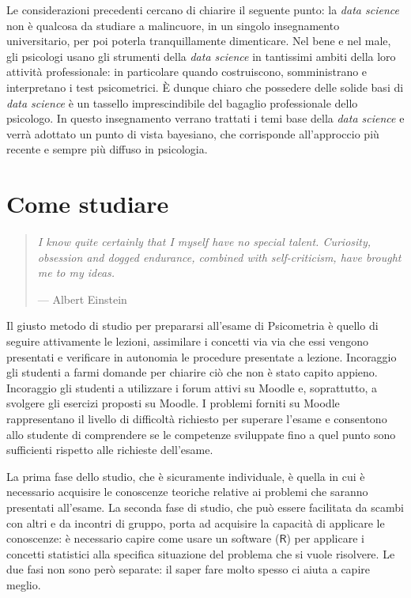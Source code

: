 \documentclass[
  10pt,
  italian,
  a4paper,
  extrafontsizes,onecolumn,openright
  ]{memoir}
\theoremstyle{definition}
\theoremstyle{definition}
\theoremstyle{definition}
\theoremstyle{definition}
\theoremstyle{remark}
\begin{document}
Le considerazioni precedenti cercano di chiarire il seguente punto: la \emph{data science} non è qualcosa da studiare a malincuore, in un singolo insegnamento universitario, per poi poterla tranquillamente dimenticare. Nel bene e nel male, gli psicologi usano gli strumenti della \emph{data science} in tantissimi ambiti della loro attività professionale: in particolare quando costruiscono, somministrano e interpretano i test psicometrici. È dunque chiaro che possedere delle solide basi di \emph{data science} è un tassello imprescindibile del bagaglio professionale dello psicologo. In questo insegnamento verrano trattati i temi base della \emph{data science} e verrà adottato un punto di vista bayesiano, che corrisponde all'approccio più recente e sempre più diffuso in psicologia.

\hypertarget{come-studiare}{%
\section*{Come studiare}\label{come-studiare}}

\begin{quote}
\emph{I know quite certainly that I myself have no special talent. Curiosity, obsession and dogged endurance, combined with self-criticism, have brought me to my ideas.}

\hfill --- Albert Einstein
\end{quote}

Il giusto metodo di studio per prepararsi all'esame di Psicometria è quello di seguire attivamente le lezioni, assimilare i concetti via via che essi vengono presentati e verificare in autonomia le procedure presentate a lezione. Incoraggio gli studenti a farmi domande per chiarire ciò che non è stato capito appieno. Incoraggio gli studenti a utilizzare i forum attivi su Moodle e, soprattutto, a svolgere gli esercizi proposti su Moodle. I problemi forniti su Moodle rappresentano il livello di difficoltà richiesto per superare l'esame e consentono allo studente di comprendere se le competenze sviluppate fino a quel punto sono sufficienti rispetto alle richieste dell'esame.

La prima fase dello studio, che è sicuramente individuale, è quella in cui è necessario acquisire le conoscenze teoriche relative ai problemi che saranno presentati all'esame. La seconda fase di studio, che può essere facilitata da scambi con altri e da incontri di gruppo, porta ad acquisire la capacità di applicare le conoscenze: è necessario capire come usare un software (\(\textsf{R}\)) per applicare i concetti statistici alla specifica situazione del problema che si vuole risolvere. Le due fasi non sono però separate: il saper fare molto spesso ci aiuta a capire meglio.
\end{document}
